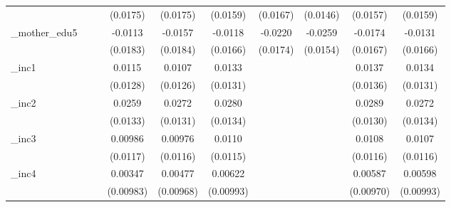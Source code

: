 \begin{table}[htbp]
\begin{tabular}{l*{9}{c}}
            &                     &                     &    (0.0175)         &    (0.0175)         &    (0.0159)         &    (0.0167)         &    (0.0146)         &    (0.0157)         &    (0.0159)         \\
[1em]
\_mother\_edu5&                     &                     &     -0.0113         &     -0.0157         &     -0.0118         &     -0.0220         &     -0.0259\sym{*}  &     -0.0174         &     -0.0131         \\
            &                     &                     &    (0.0183)         &    (0.0184)         &    (0.0166)         &    (0.0174)         &    (0.0154)         &    (0.0167)         &    (0.0166)         \\
[1em]
\_inc1       &                     &                     &      0.0115         &      0.0107         &      0.0133         &                     &                     &      0.0137         &      0.0134         \\
            &                     &                     &    (0.0128)         &    (0.0126)         &    (0.0131)         &                     &                     &    (0.0136)         &    (0.0131)         \\
[1em]
\_inc2       &                     &                     &      0.0259\sym{*}  &      0.0272\sym{**} &      0.0280\sym{**} &                     &                     &      0.0289\sym{**} &      0.0272\sym{**} \\
            &                     &                     &    (0.0133)         &    (0.0131)         &    (0.0134)         &                     &                     &    (0.0130)         &    (0.0134)         \\
[1em]
\_inc3       &                     &                     &     0.00986         &     0.00976         &      0.0110         &                     &                     &      0.0108         &      0.0107         \\
            &                     &                     &    (0.0117)         &    (0.0116)         &    (0.0115)         &                     &                     &    (0.0116)         &    (0.0116)         \\
[1em]
\_inc4       &                     &                     &     0.00347         &     0.00477         &     0.00622         &                     &                     &     0.00587         &     0.00598         \\
            &                     &                     &   (0.00983)         &   (0.00968)         &   (0.00993)         &                     &                     &   (0.00970)         &   (0.00993)         \\

\end{tabular}
\end{table}
